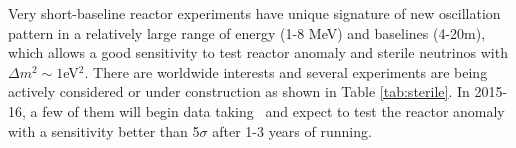 Very short-baseline reactor experiments have unique signature of new oscillation pattern in a relatively large range of energy (1-8 MeV) and baselines (4-20m), which allows a good sensitivity to test reactor anomaly and sterile neutrinos with $\Delta m^2\sim1$eV$^2$. There are worldwide interests and several experiments are being 
actively considered or under construction as shown in Table \ref{tab:sterile}. In 2015-16, a few of them will begin data taking~\cite{Lhuillier-Neutrino14} and expect to test the reactor anomaly with a sensitivity better than 5$\sigma$ after 1-3 years of running.



